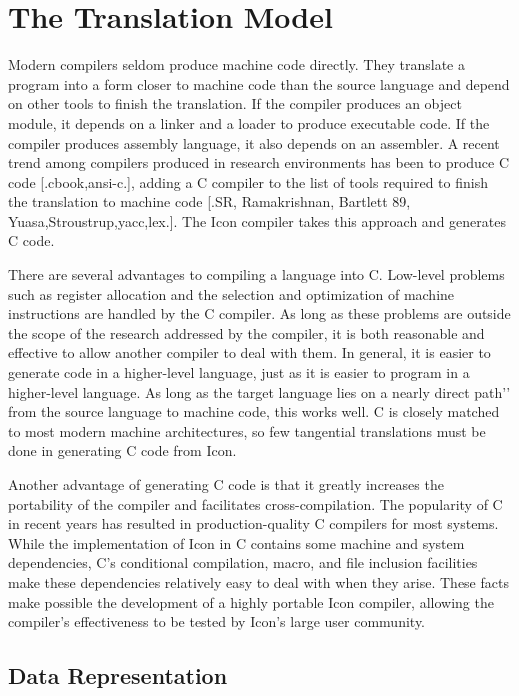 \clearpage\chapter{The Translation Model}

Modern compilers seldom produce machine code directly. They translate
a program into a form closer to machine code than the source language
and depend on other tools to finish the translation. If the compiler
produces an object module, it depends on a linker and a loader to
produce executable code. If the compiler produces assembly language,
it also depends on an assembler. A recent trend among compilers
produced in research environments has been to produce C code
[.cbook,ansi-c.], adding a C compiler to the list of tools required to
finish the translation to machine code [.SR, Ramakrishnan, Bartlett
89, Yuasa,Stroustrup,yacc,lex.]. The Icon compiler takes this approach
and generates C code.


There are several advantages to compiling a language into C. Low-level
problems such as register allocation and the selection and
optimization of machine instructions are handled by the C compiler. As
long as these problems are outside the scope of the research addressed
by the compiler, it is both reasonable and effective to allow another
compiler to deal with them. In general, it is easier to generate code
in a higher-level language, just as it is easier to program in a
higher-level language. As long as the target language lies on a
{\textasciigrave}{\textasciigrave}nearly direct path'{}' from the
source language to machine code, this works well. C is closely matched
to most modern machine architectures, so few tangential translations
must be done in generating C code from Icon.


Another advantage of generating C code is that it greatly increases
the portability of the compiler and facilitates cross-compilation. The
popularity of C in recent years has resulted in production-quality C
compilers for most systems.  While the implementation of Icon in C
contains some machine and system dependencies, C's conditional
compilation, macro, and file inclusion facilities make these
dependencies relatively easy to deal with when they arise. These facts
make possible the development of a highly portable Icon compiler,
allowing the compiler's effectiveness to be tested by Icon's large
user community.

\section{Data Representation}

